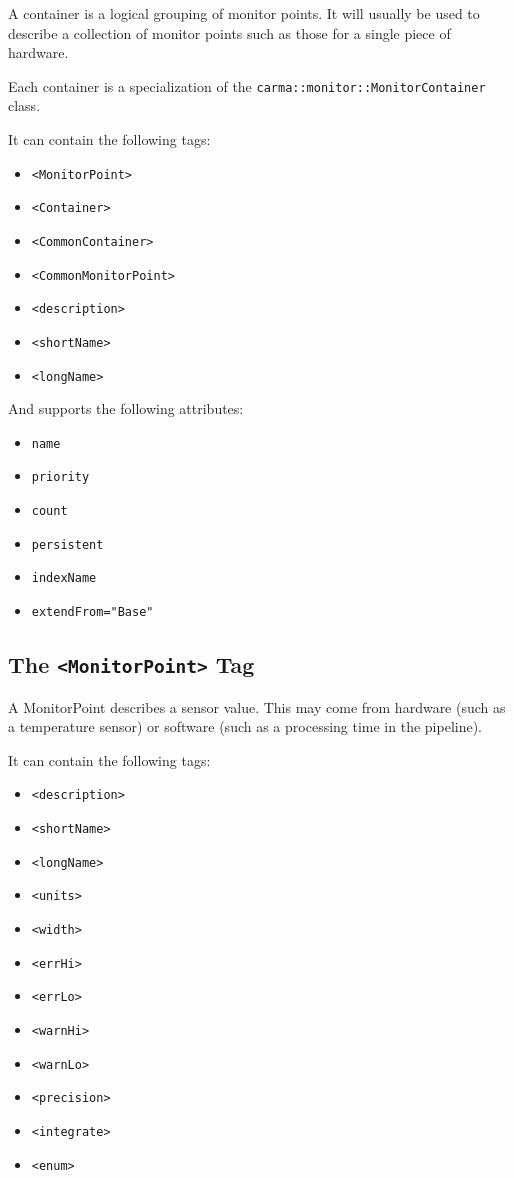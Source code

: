 \documentclass[letterpaper,12pt,oneside,pdftex]{article}
\newcommand{\mpml}[1]{\texttt{<#1>}}
\newcommand{\attr}[1]{\texttt{#1}}
\newenvironment{pitemize}{
\begin{itemize}
  \setlength{\itemsep}{1pt}
  \setlength{\parskip}{0pt}
  \setlength{\parsep}{0pt}
}{\end{itemize}}
\begin{document}
A container is a logical grouping of monitor points. It will usually be used to
describe a collection of monitor points such as those for a single piece of
hardware.

Each container is a specialization of the
\texttt{carma::monitor::MonitorContainer} class.

It can contain the following tags:

\begin{pitemize}
\item \mpml{MonitorPoint}
\item \mpml{Container}
\item \mpml{CommonContainer}
\item \mpml{CommonMonitorPoint}
\item \mpml{description}
\item \mpml{shortName}
\item \mpml{longName}
\end{pitemize}

And supports the following attributes:

\begin{pitemize}
\item \attr{name}
\item \attr{priority}
\item \attr{count}
\item \attr{persistent}
\item \attr{indexName}
\item \attr{extendFrom="Base"}
\end{pitemize}

\subsection{The \mpml{MonitorPoint} Tag}

A MonitorPoint describes a sensor value. This may come from hardware (such as a
temperature sensor) or software (such as a processing time in the pipeline).

It can contain the following tags:

\begin{pitemize}
\item \mpml{description}
\item \mpml{shortName}
\item \mpml{longName}
\item \mpml{units}
\item \mpml{width}
\item \mpml{errHi}
\item \mpml{errLo}
\item \mpml{warnHi}
\item \mpml{warnLo}
\item \mpml{precision}
\item \mpml{integrate}
\item \mpml{enum}
\end{pitemize}
\end{document}

